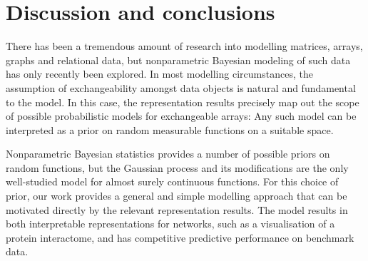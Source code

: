 \section{Discussion and conclusions}



There has been a tremendous amount of research into modelling matrices, arrays, graphs and relational data, but nonparametric
Bayesian modeling of such data has only recently been explored.
In most modelling circumstances, the assumption of exchangeability amongst data objects is natural and fundamental to the model.
In this case, the representation results 
\citep{Aldous:1981,Hoover:1979,Kallenberg:1992} 
precisely map out the scope of possible probabilistic models for exchangeable arrays:
Any such model can be interpreted as a prior on random measurable functions on a suitable space.

Nonparametric Bayesian statistics provides a number of possible priors on random functions, but the Gaussian process
and its modifications are the only well-studied model for almost surely continuous functions.
For this choice of prior, our work provides a general and simple modelling approach that can be motivated directly by the
relevant representation results.
The model results in both interpretable representations for networks, such as a visualisation of a protein interactome, and has 
competitive predictive performance on benchmark data.

